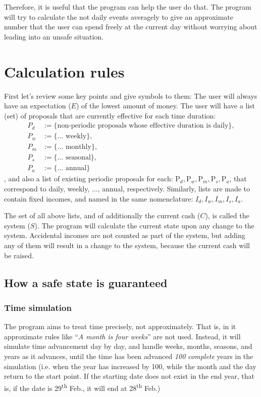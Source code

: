 Therefore, it is useful that the program can help the user do that. The program will try to calculate the not daily events averagely to give an approximate number that the user can spend freely at the current day without worrying about leading into an unsafe situation.

\section{Calculation rules} \label{sec:cal.rule}
First let's review some key points and give symbols to them: The user will always have an expectation ($E$) of the lowest amount of money. The user will have a list (set) of proposals that are currently effective for each time duration:
\begin{align*}
P_d &:= \{\text{non-periodic proposals whose effective duration is daily} \}, 
\\P_w &:= \{\text{... weekly}\}, 
\\P_m &:= \{\text{... monthly}\}, 
\\P_s &:= \{\text{... seasonal}\}, 
\\P_a &:= \{\text{... annual}\}
\end{align*},
and also a list of existing periodic proposals for each: $\mathrm{P}_d, \mathrm{P}_w, \mathrm{P}_m, \mathrm{P}_s, \mathrm{P}_a$, that correspond to daily, weekly, ..., annual, respectively. Similarly, lists are made to contain fixed incomes, and named in the same nomenclature: $I_d, I_w, I_m, I_s, I_a$.

The set of all above lists, and of additionally the current cash ($C$), is called the system ($S$). The program will calculate the current state upon any change to the system. Accidental incomes are not counted as part of the system, but adding any of them will result in a change to the system, because the current cash will be raised.

\subsection{How a safe state is guaranteed}
\subsubsection{Time simulation} \label{subsubsec:cal:state.cal:time.sim}
The program aims to treat time precisely, not approximately. That is, in it approximate rules like ``\emph{A month is four weeks}'' are not used. Instead, it will simulate time advancement day by day, and handle weeks, months, seasons, and years as it advances, until the time has been advanced \emph{100 complete} years in the simulation (i.e. when the year has increased by 100, while the month and the day return to the start point. If the starting date does not exist in the end year, that is, if the date is 29\textsuperscript{th} Feb., it will end at 28\textsuperscript{th} Feb.)

